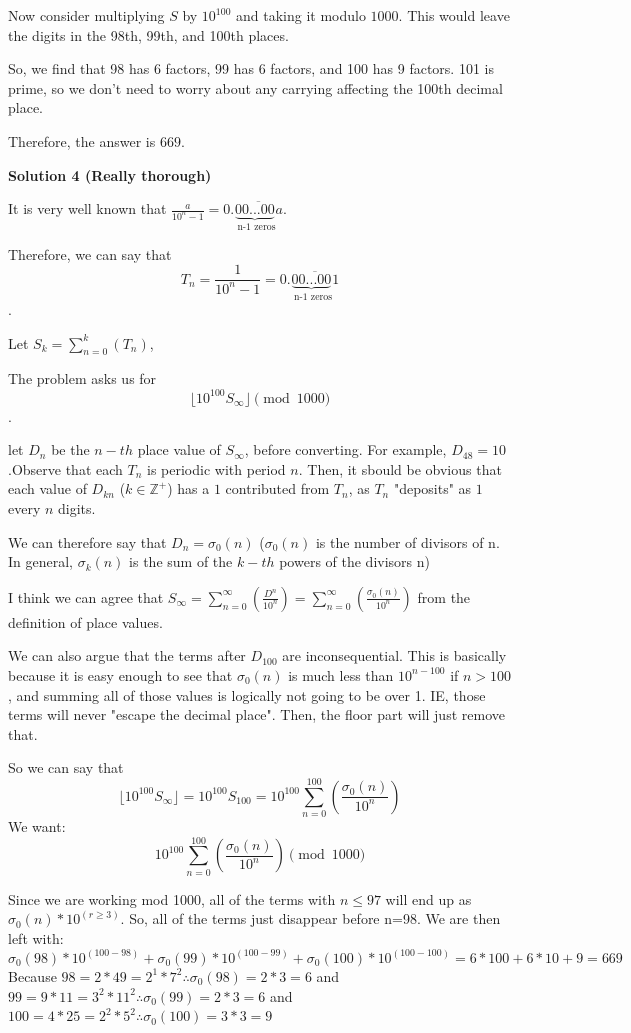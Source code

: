 \begin{enumerate}
 Now consider multiplying $S$ by $10^{100}$ and taking it modulo $1000$. This would leave the digits in the 98th, 99th, and 100th places. 

 So, we find that 98 has 6 factors, 99 has 6 factors, and 100 has 9 factors. 101 is prime, so we don't need to worry about any carrying affecting the 100th decimal place. 

 Therefore, the answer is $\boxed{669}$.

 



\textbf{Solution 4 (Really thorough)}

It is very well known that $\frac{a}{10^n-1}=0.\overline{\underbrace{00...00}_{\text{ n-1 zeros}}a}$. 

 Therefore, we can say that 
 \[T_n=\frac{1}{10^n-1}=0.\overline{\underbrace{00...00}_{\text{ n-1 zeros}}1}\].

 Let $S_k=\sum_{n=0}^k(T_n)$, 

 The problem asks us for 
 \[\lfloor10^{100}S_\infty\rfloor\pmod{1000}\].

 let $D_n$ be the $n-th$ place value of $S_\infty$, before converting. For example, $D_{48}=10$.Observe that each $T_n$ is periodic with period $n$. Then, it sbould be obvious that each value of $D_{kn}$ ($k\in\mathbb{Z^+}$) has a $1$ contributed from $T_n$, as $T_n$ "deposits" as $1$ every $n$ digits.  

 


 We can therefore say that $D_n=\sigma_0(n)$ ($\sigma_0(n)$ is the number of divisors of n. In general, $\sigma_k(n)$ is the sum of the $k-th$ powers of the divisors n)

 I think we can agree that $S_\infty=\sum_{n=0}^\infty(\frac{D^n}{10^n})=\sum_{n=0}^\infty(\frac{\sigma_0(n)}{10^n})$ from the definition of place values.

 We can also argue that the terms after $D_{100}$ are inconsequential. This is basically because it is easy enough to see that $\sigma_0(n)$ is much less than $10^{n-100}$ if $n>100$, and summing all of those values is logically not going to be over 1. IE, those terms will never "escape the decimal place". Then, the floor part will just remove that.

 So we can say that 
 \[\lfloor10^{100}S_\infty\rfloor=10^{100}S_{100}=10^{100}\sum_{n=0}^{100}(\frac{\sigma_0(n)}{10^n})\]We want: 
 \[10^{100}\sum_{n=0}^{100}(\frac{\sigma_0(n)}{10^n})\pmod{1000}\]

 Since we are working mod 1000, all of the terms with $n\leq97$ will end up as $\sigma_0(n)*10^{(r\geq3)}$. So, all of the terms just disappear before n=98. We are then left with: 
 \[{\sigma_0(98)}*{10^{(100-98)}}+{\sigma_0(99)}*{10^{(100-99)}}+{\sigma_0(100)}*{10^{(100-100)}}=6*100+6*10+9=\boxed{669}\] Because $98=2*49=2^1*7^2\therefore\sigma_0(98)=2*3=6$ and $99=9*11=3^2*11^2\therefore\sigma_0(99)=2*3=6$ and $100=4*25=2^2*5^2\therefore\sigma_0(100)=3*3=9$





\end{enumerate}
